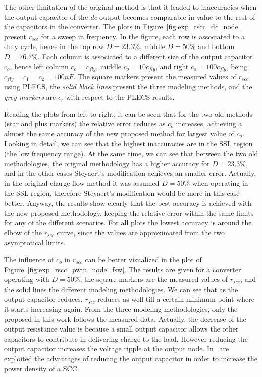 The other limitation of the original method is that it leaded to inaccuracies when the output capacitor of the \emph{dc}-output becomes comparable in value to the rest of the capacitors in the converter. The plots in Figure~\ref{fig:exp_rscc_dc_node} present $r_{scc}$ for a sweep in frequency. In the figure, each row is associated to a duty cycle, hence in the top row $D=23.3\%$, middle $D=50\%$ and bottom $D=76.7\%$. Each column is associated to a different size of the output capacitor $c_o$, hence left column $c_o=c_{fly}$, middle $c_o=10c_{fly}$, and right $c_o=100c_{fly}$, being $c_{fly}=c_1=c_2 =100nF$. The square markers present the measured values of $r_{scc}$ using PLECS, the \emph{solid black lines} present the three modeling methods, and the \emph{grey markers} are $\epsilon_r$ with respect to the PLECS results.

Reading the plots from left to right, it can be seen that for the two old methods (star and plus markers) the relative error reduces as $c_o$ increases, achieving a almost the same accuracy of the new proposed method for largest value of $c_o$. Looking in detail, we can see that the highest inaccuracies are in the SSL region (the low frequency range). At the same time, we can see that between the two old methodologies, the original methodology has a higher accuracy for $D=23.3\%$, and in the other cases Steyaert's modification achieves an smaller error. Actually, in the original charge flow method it was assumed $D=50\%$ when operating in the SSL region, therefore Steyaert's modification would be more in this case better. Anyway, the results show clearly that the best accuracy is achieved with the new proposed methodology, keeping the relative error within the same limits for any of the different scenarios. For all plots the lowest accuracy is around the elbow of the $r_{scc}$ curve, since the values are approximated from the two asymptotical limits.


The influence of $c_o$ in $r_{scc}$ can be better visualized in the plot of  Figure~\ref{fig:exp_rscc_pwm_node_fsw}. The results are given for a converter operating with $D=50\%$, the square markers are the measured values of $r_{scc}$, and the solid lines the different modeling methodologies. We can see that as the output capacitor reduces, $r_{scc}$ reduces as well till a certain minimum point where it starts increasing again. From the three modeling methodologies, only the  proposed in this work follows the measured data. Actually, the decrease of the output resistance value is because a small output capacitor allows the other capacitors to contribute in delivering charge to the load. However reducing the output capacitor increases the voltage ripple at the output node. In~\cite{14Andersen} are exploited the advantages of reducing the output capacitor in order to increase the power density of a SCC.

